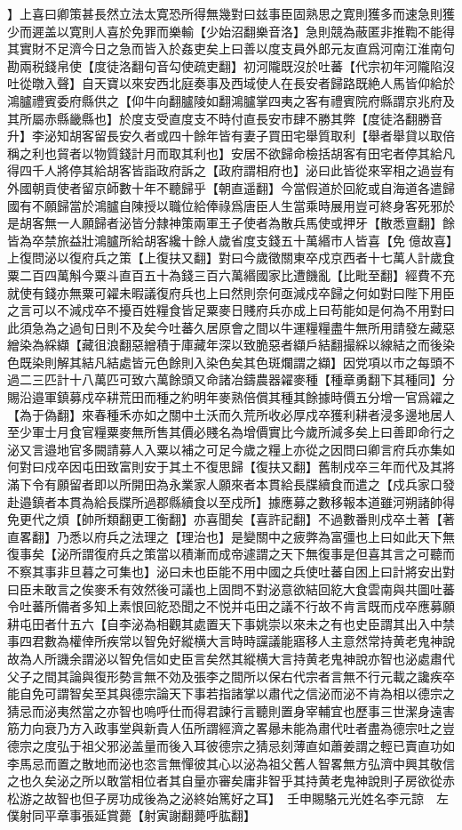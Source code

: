】上喜曰卿策甚長然立法太寛恐所得無幾對曰兹事臣固熟思之寛則獲多而速急則獲少而遲盖以寛則人喜於免罪而樂輸【少始沼翻樂音洛】急則競為蔽匿非推鞫不能得其實財不足濟今日之急而皆入於姦吏矣上曰善以度支員外郎元友直爲河南江淮南句勘兩税錢帛使【度徒洛翻句音勾使疏吏翻】初河隴既沒於吐蕃【代宗初年河隴陷沒吐從暾入聲】自天寶以來安西北庭奏事及西域使人在長安者歸路既絶人馬皆仰給於鴻臚禮賓委府縣供之【仰牛向翻臚陵如翻鴻臚掌四夷之客有禮賓院府縣謂京兆府及其所屬赤縣畿縣也】於度支受直度支不時付直長安市肆不勝其弊【度徒洛翻勝音升】李泌知胡客留長安久者或四十餘年皆有妻子買田宅舉質取利【舉者舉貸以取倍稱之利也貿者以物質錢計月而取其利也】安居不欲歸命檢括胡客有田宅者停其給凡得四千人將停其給胡客皆詣政府訴之【政府謂相府也】泌曰此皆從來宰相之過豈有外國朝貢使者留京師數十年不聽歸乎【朝直遥翻】今當假道於回紇或自海道各遣歸國有不願歸當於鴻臚自陳授以職位給俸祿爲唐臣人生當乘時展用豈可終身客死邪於是胡客無一人願歸者泌皆分隸神策兩軍王子使者為散兵馬使或押牙【散悉亶翻】餘皆為卒禁旅益壯鴻臚所給胡客纔十餘人歲省度支錢五十萬緡市人皆喜【免億故喜】上復問泌以復府兵之策【上復扶又翻】對曰今歲徵關東卒戍京西者十七萬人計歲食粟二百四萬斛今粟斗直百五十為錢三百六萬緡國家比遭饑亂【比毗至翻】經費不充就使有錢亦無粟可糴未暇議復府兵也上曰然則奈何亟減戍卒歸之何如對曰陛下用臣之言可以不減戍卒不擾百姓糧食皆足粟麥日賤府兵亦成上曰苟能如是何為不用對曰此須急為之過旬日則不及矣今吐蕃久居原會之間以牛運糧糧盡牛無所用請發左藏惡繒染為綵纈【藏徂浪翻惡繒積于庫藏年深以致脆惡者纈戶結翻撮綵以線結之而後染色既染則解其結凡結處皆元色餘則入染色矣其色斑爛謂之纈】因党項以市之每頭不過二三匹計十八萬匹可致六萬餘頭又命諸冶鑄農器糴麥種【種章勇翻下其種同】分賜沿邉軍鎮募戍卒耕荒田而種之約明年麥熟倍償其種其餘據時價五分增一官爲糴之【為于偽翻】來春種禾亦如之關中土沃而久荒所收必厚戍卒獲利耕者浸多邊地居人至少軍士月食官糧粟麥無所售其價必賤名為增價實比今歲所減多矣上曰善即命行之泌又言邉地官多闕請募人入粟以補之可足今歲之糧上亦從之因問曰卿言府兵亦集如何對曰戍卒因屯田致富則安于其土不復思歸【復扶又翻】舊制戍卒三年而代及其將滿下令有願留者即以所開田為永業家人願來者本貫給長牒續食而遣之【戍兵家口發赴邉鎮者本貫為給長牒所過郡縣續食以至戍所】據應募之數移報本道雖河朔諸帥得免更代之煩【帥所類翻更工衡翻】亦喜聞矣【喜許記翻】不過數番則戍卒土著【著直畧翻】乃悉以府兵之法理之【理治也】是變關中之疲弊為富彊也上曰如此天下無復事矣【泌所謂復府兵之策當以積漸而成帝遽謂之天下無復事是但喜其言之可聽而不察其事非旦暮之可集也】泌曰未也臣能不用中國之兵使吐蕃自困上曰計將安出對曰臣未敢言之俟麥禾有效然後可議也上固問不對泌意欲結回紇大食雲南與共圖吐蕃令吐蕃所備者多知上素恨回紇恐聞之不悦并屯田之議不行故不肯言既而戍卒應募願耕屯田者什五六【自李泌為相觀其處置天下事姚崇以來未之有也史臣謂其出入中禁事四君數為權倖所疾常以智免好縱横大言時時讜議能寤移人主意然常持黄老鬼神說故為人所譏余謂泌以智免信如史臣言矣然其縱横大言持黄老鬼神說亦智也泌處肅代父子之間其論與復形勢言無不効及張李之間所以保右代宗者言無不行元載之讒疾卒能自免可謂智矣至其與德宗論天下事若指諸掌以肅代之信泌而泌不肯為相以德宗之猜忌而泌夷然當之亦智也嗚呼仕而得君諫行言聽則置身宰輔宜也歷事三世潔身遠害筋力向衰乃方入政事堂與新貴人伍所謂經濟之畧曏未能為肅代吐者盡為德宗吐之豈德宗之度弘于祖父邪泌盖量而後入耳彼德宗之猜忌刻薄直如蕭姜謂之輕已賣直功如李馬忌而置之散地而泌也恣言無憚彼其心以泌為祖父舊人智畧無方弘濟中興其敬信之也久矣泌之所以敢當相位者其自量亦審矣庸非智乎其持黄老鬼神說則子房欲從赤松游之故智也但子房功成後為之泌終始篤好之耳】　壬申賜駱元光姓名李元諒　左僕射同平章事張延賞薨【射寅謝翻薨呼肱翻】

